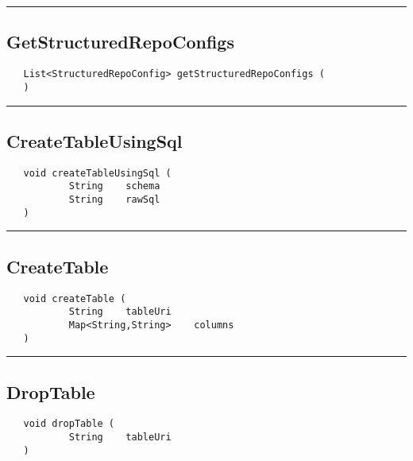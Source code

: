 \rule{15cm}{2pt}
\subsection{GetStructuredRepoConfigs}
\label{Api:GetStructuredRepoConfigs}
\begin{verbatim}
   List<StructuredRepoConfig> getStructuredRepoConfigs (
   )
\end{verbatim}



\rule{15cm}{2pt}
\subsection{CreateTableUsingSql}
\label{Api:CreateTableUsingSql}
\begin{verbatim}
   void createTableUsingSql (
           String    schema
           String    rawSql
   )
\end{verbatim}



\rule{15cm}{2pt}
\subsection{CreateTable}
\label{Api:CreateTable}
\begin{verbatim}
   void createTable (
           String    tableUri
           Map<String,String>    columns
   )
\end{verbatim}



\rule{15cm}{2pt}
\subsection{DropTable}
\label{Api:DropTable}
\begin{verbatim}
   void dropTable (
           String    tableUri
   )
\end{verbatim}



